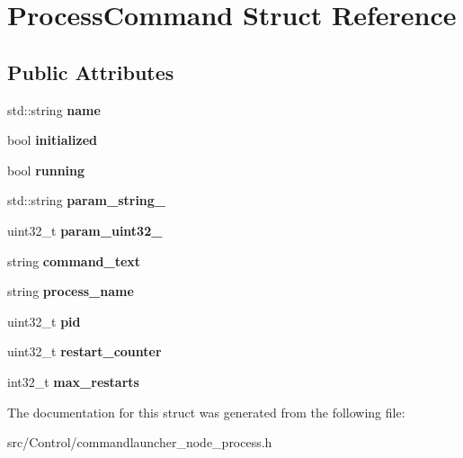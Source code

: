 \hypertarget{structProcessCommand}{}\section{Process\+Command Struct Reference}
\label{structProcessCommand}
\subsection*{Public Attributes}
\begin{DoxyCompactItemize}
\item 
\mbox{\label{structProcessCommand_aa09393a19cff3231a5986e1e8a6c97d6}} 
std\+::string {\bfseries name}
\item 
\mbox{\label{structProcessCommand_a5af31085389b55168ad945095d0ba164}} 
bool {\bfseries initialized}
\item 
\mbox{\label{structProcessCommand_a844fda483758f253e71e84ce600d3143}} 
bool {\bfseries running}
\item 
\mbox{\label{structProcessCommand_aa8b57531492a0dc022e14407e68a5b17}} 
std\+::string {\bfseries param\+\_\+string\+\_}
\item 
\mbox{\label{structProcessCommand_afaafd750ccb407d84eded887d7f72cf0}} 
uint32\+\_\+t {\bfseries param\+\_\+uint32\+\_}
\item 
\mbox{\label{structProcessCommand_ac9f20a329a8adb961bed9407a2515ccd}} 
string {\bfseries command\+\_\+text}
\item 
\mbox{\label{structProcessCommand_ab0e91942d4d4274c5dbe8014f5b8e0a0}} 
string {\bfseries process\+\_\+name}
\item 
\mbox{\label{structProcessCommand_a4b0c64c2621d5ea4a3e203faf038ebea}} 
uint32\+\_\+t {\bfseries pid}
\item 
\mbox{\label{structProcessCommand_adb102137587a99ef2caed9c1c0a2da44}} 
uint32\+\_\+t {\bfseries restart\+\_\+counter}
\item 
\mbox{\label{structProcessCommand_aab22537ebda446da580581d1bcc59050}} 
int32\+\_\+t {\bfseries max\+\_\+restarts}
\end{DoxyCompactItemize}


The documentation for this struct was generated from the following file\+:\begin{DoxyCompactItemize}
\item 
src/\+Control/commandlauncher\+\_\+node\+\_\+process.\+h\end{DoxyCompactItemize}
